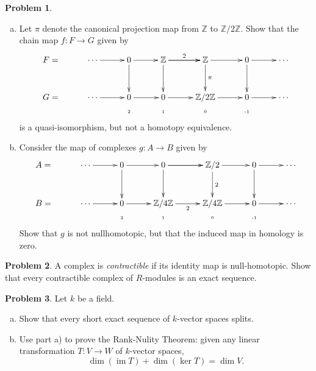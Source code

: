 \documentclass[11pt]{article}
\DeclareMathOperator{\im}{im}
\newcommand{\Z}{\mathbb{Z}}
\theoremstyle{definition}
\newtheorem{problem}{Problem}
\begin{document}
\begin{problem}$\,$
\begin{enumerate}[a)]
	\item Let $\pi$ denote the canonical projection map from $\Z$ to $\Z/2\Z$. Show that the chain map $f\!: F \longrightarrow G$ given by
$$\xymatrix@R=1mm@C=10mm{F = & \cdots \ar[r] & 0 \ar[r] \ar[dddd] & \Z \ar[r]^-2 \ar[dddd] \ar[r] & \Z \ar[dddd]^-{\pi} \ar[r] & 0 \ar[dddd] \ar[r] & \cdots \\
	&&&&\\ 
	&&&&\\ 
	&&&&\\ 
	G = &\cdots \ar[r] & 0 \ar[r] & 0 \ar[r] & \Z/2\Z \ar[r] & 0 \ar[r] & \cdots \\
	&& \textrm{\tiny 2} & \textrm{\tiny 1} & \textrm{\tiny 0} &\textrm{\tiny -1}}$$
is a quasi-isomorphism, but not a homotopy equivalence.
	
\item Consider the map of complexes $g\!: A \to B$ given by
$$\xymatrix@R=1mm@C=10mm{A = & \cdots \ar[r] & 0 \ar[r] \ar[dddd] & 0 \ar[r] \ar[dddd] \ar[r] & \Z/2 \ar[dddd]^-{2} \ar[r] & 0 \ar[dddd] \ar[r] & \cdots \\ 
	&&&&\\ 
	&&&&\\ 
	&&&&\\ 
	B = & \cdots \ar[r] & 0 \ar[r] & \Z/4\Z \ar[r]_-2 & \Z/4\Z \ar[r] & 0 \ar[r] & \cdots \\
	&& \textrm{\tiny 2} & \textrm{\tiny 1} & \textrm{\tiny 0} &\textrm{\tiny -1}}$$
Show that $g$ is not nullhomotopic, but that the induced map in homology is zero.
\end{enumerate}
\end{problem}

\vfill

\begin{problem}
	A complex is \emph{contractible} if its identity map is null-homotopic. Show that every contractible complex of $R$-modules is an exact sequence.
\end{problem}

\vfill


\begin{problem}
	Let $k$ be a field. 
\begin{enumerate}[a)]
	\item Show that every short exact sequence of $k$-vector spaces splits.	
	\item Use part a) to prove the Rank-Nulity Theorem: given any linear transformation $T\!: V \to W$ of $k$-vector spaces, 
	$$\dim(\im T) + \dim(\ker T) = \dim V.$$
\end{enumerate}
\end{problem}
\end{document}
